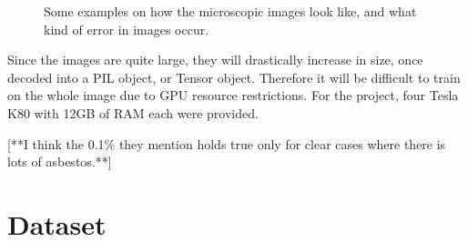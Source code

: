 \begin{figure}[t]
\centering
{}
\caption{Some examples on how the microscopic images look like, and what kind of error in images occur.}
\label{fig:basic_examples}
\end{figure}

Since the images are quite large, they will drastically increase in size, once decoded into a PIL object, or Tensor object. Therefore it will be difficult to train on the whole image due to GPU resource restrictions. For the project, four Tesla K80 with 12GB of RAM each were provided.

[**I think the 0.1\% they mention holds true only for clear cases where there is lots of asbestos.**]

\section{Dataset}

